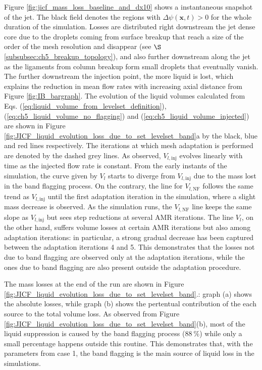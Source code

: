 Figure \ref{fig:jicf_mass_loss_baseline_and_dx10} shows a instantaneous snapshot of the jet. The black field denotes the regions with $\Delta \psi \left( \textbf{x}, t \right) > 0$ for the whole duration of the simulation. Losses are distributed right downstream the jet dense core due to the droplets coming from surface breakup that reach a size of the order of the mesh resolution and disappear (see $\S$\ref{subsubsec:ch5_breakup_topology}), and also further downstream along the jet as the ligaments from column breakup form small droplets that eventually vanish. The further downstream the injection point, the more liquid is lost, which explains the reduction in mean flow rates with increasing axial distance from Figure \ref{fig:IB_bargraph}. The evolution of the liquid volumes calculated from Eqs. (\ref{eq:liquid_volume_from_levelset_definition}), (\ref{eq:ch5_liquid_volume_no_flagging}) and (\ref{eq:ch5_liquid_volume_injected}) are shown in Figure \ref{fig:JICF_liquid_evolution_loss_due_to_set_levelset_band}a by the black, blue and red lines respectively. The iterations at which mesh adaptation is performed are denoted by the dashed grey lines.  As observed, $V_{l,\mathrm{inj}}$ evolves linearly with time as the injected flow rate is constant. From the early instants of the simulation, the curve given by $V_l$ starts to diverge from $V_{l,\mathrm{inj}}$ due to the mass lost in the band flagging process. On the contrary, the line for $V_{l,\mathrm{NF}}$ follows the same trend as $V_{l,\mathrm{inj}}$ until the first adaptation iteration in the simulation, where a slight mass decrease is observed. As the simulation runs, the $V_{l,\mathrm{NF}}$ line keeps the same slope as $V_{l,\mathrm{inj}}$ but sees step reductions at several AMR iterations. The line $V_l$, on the other hand, suffers volume losses at certain AMR iterations but also among adaptation iterations: in particular, a strong gradual decrease has been captured between the adaptation iterations 4 and 5. This demonstrates that the losses not due to band flagging are observed only at the adaptation iterations, while the ones due to band flagging are also present outside the adaptation procedure. 

The mass losses at the end of the run are shown in Figure \ref{fig:JICF_liquid_evolution_loss_due_to_set_levelset_band}.: graph (a) shows the absolute losses, while graph (b) shows the pertentual contribution of the each source to the total volume loss. As observed from Figure \ref{fig:JICF_liquid_evolution_loss_due_to_set_levelset_band}(b), most of the liquid suppression is caused by the band flagging process ($88~\%$) while only a small percentage happens outside this routine. This demonstrates that, with the parameters from case 1, the band flagging is the main source of liquid loss in the simulations.

